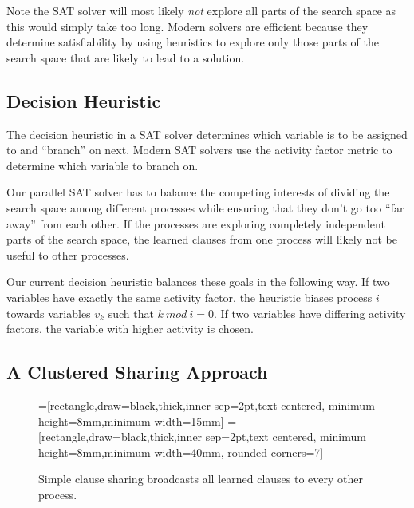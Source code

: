 \documentclass[letterpaper, compsoc, conference]{IEEEtran}
\begin{document}
Note the SAT solver will most likely \textit{not} explore all parts of the
search space as this would simply take too long. Modern solvers are efficient
because they determine satisfiability by using heuristics to explore only
those parts of the search space that are likely to lead to a solution.

\subsection{Decision Heuristic} 

The decision heuristic in a SAT solver determines which variable is to be
assigned to and ``branch'' on next. Modern SAT solvers use the activity factor
metric to determine which variable to branch on.

Our parallel SAT solver has to balance the competing interests of dividing the
search space among different processes while ensuring that they don't go too
``far away'' from each other. If the processes are exploring completely
independent parts of the search space, the learned clauses from one process
will likely not be useful to other processes. 

Our current decision heuristic balances these goals in the following way.  If
two variables have exactly the same activity factor, the heuristic biases
process $i$ towards variables $v_k$ such that $k~mod~i=0$. If two variables
have differing activity factors, the variable with higher activity is chosen.

\subsection{A Clustered Sharing Approach}

\begin{figure}[htbp]
    =[rectangle,draw=black,thick,inner sep=2pt,text centered,
                     minimum height=8mm,minimum width=15mm]
    =[rectangle,draw=black,thick,inner sep=2pt,text centered,
                        minimum height=8mm,minimum width=40mm, rounded corners=7]
    \begin{center}
    \end{center}
    \caption{Simple clause sharing broadcasts all learned clauses to every other process.}
    \label{fig:simple}
\end{figure}
\end{document}
